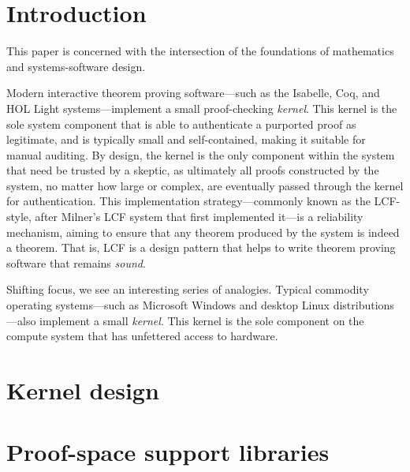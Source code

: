 \documentclass[a4paper, 10pt]{article}
\begin{document}
\section{Introduction}
\label{sect.introduction}

This paper is concerned with the intersection of the foundations of mathematics and systems-software design.

Modern interactive theorem proving software---such as the Isabelle, Coq, and HOL Light systems---implement a small proof-checking \emph{kernel}.
This kernel is the sole system component that is able to authenticate a purported proof as legitimate, and is typically small and self-contained, making it suitable for manual auditing.
By design, the kernel is the only component within the system that need be trusted by a skeptic, as ultimately all proofs constructed by the system, no matter how large or complex, are eventually passed through the kernel for authentication.
This implementation strategy---commonly known as the LCF-style, after Milner's LCF system that first implemented it---is a reliability mechanism, aiming to ensure that any theorem produced by the system is indeed a theorem.
That is, LCF is a design pattern that helps to write theorem proving software that remains \emph{sound}.

Shifting focus, we see an interesting series of analogies.
Typical commodity operating systems---such as Microsoft Windows and desktop Linux distributions---also implement a small \emph{kernel}.
This kernel is the sole component on the compute system that has unfettered access to hardware.

\section{Kernel design}
\label{sect.kernel.design}

\section{Proof-space support libraries}
\label{sect.proof-space.support.libraries}
\end{document}
